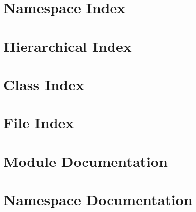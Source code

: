 \let\mypdfximage\pdfximage\def\pdfximage{\immediate\mypdfximage}\documentclass[twoside]{book}
\newcommand{\+}{\discretionary{\mbox{\scriptsize$\hookleftarrow$}}{}{}}
\begin{document}
\chapter{Namespace Index}

\chapter{Hierarchical Index}

\chapter{Class Index}

\chapter{File Index}

\chapter{Module Documentation}














\chapter{Namespace Documentation}




\end{document}
